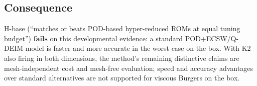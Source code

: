\subsection*{Consequence}
H-base (``matches or beats POD-based hyper-reduced ROMs at equal tuning budget'') \textbf{fails} on this developmental evidence: a standard POD+ECSW/Q-DEIM model is faster and more accurate in the worst case on the box. With K2 also firing in both dimensions, the method's remaining distinctive claims are mesh-independent cost and mesh-free evaluation; speed and accuracy advantages over standard alternatives are not supported for viscous Burgers on the box.
